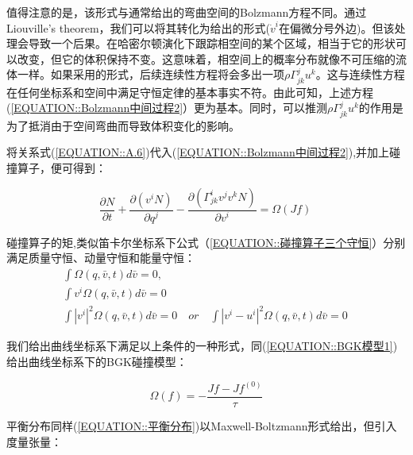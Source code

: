 \documentclass[LBMDerivation.tex]{subfiles}
\begin{document}
%

值得注意的是，该形式与通常给出的弯曲空间的Bolzmann方程不同。通过Liouville’s theorem，我们可以将其转化为\cite{mendoza2013flow}给出的形式($\dot{v}^i$在偏微分号外边)。但该处理会导致一个后果。在哈密尔顿演化下跟踪相空间的某个区域，相当于它的形状可以改变，但它的体积保持不变。这意味着，相空间上的概率分布就像不可压缩的流体一样。如果采用\cite{mendoza2013flow}的形式，后续连续性方程将会多出一项$\rho  \Gamma_{jk}^j u^k$。这与连续性方程在任何坐标系和空间中满足守恒定律的基本事实不符。由此可知，上述方程(\ref{EQUATION::Bolzmann中间过程2}）更为基本。同时，可以推测$\rho  \Gamma_{jk}^j u^k$的作用是为了抵消由于空间弯曲而导致体积变化的影响。
%

%

将关系式(\ref{EQUATION::A.6})代入(\ref{EQUATION::Bolzmann中间过程2}),并加上碰撞算子，便可得到：

\begin{equation}
  \boxed{
    \frac{\partial N}{\partial t}+\frac{\partial (v^i N)}{\partial q^{j}} -  \frac{\partial ( \Gamma_{j k}^{i} v^{j} v^{k}  N)}{\partial  v^i } =\Omega(Jf)
  }
  \label{EQUATION::Bolzamman 曲线} ~
\end{equation}










%
%

碰撞算子的矩,类似笛卡尔坐标系下公式（\ref{EQUATION::碰撞算子三个守恒}）分别满足质量守恒、动量守恒和能量守恒：
\begin{equation}
  \begin{aligned}
    \int  \Omega(q, \bar{v}, t)d \bar{v}=0,      \\
    \int  v^{i} \Omega(q, \bar{v}, t)d \bar{v}=0 \\
    \int|v^i|^2 \Omega(q, \bar{v}, t) d \bar{v} =0 \quad or \quad \int |v^i-u^i|^2 \Omega(q, \bar{v}, t) d \bar{v} =0
  \end{aligned}
  \label{EQUATION::碰撞特性} ~
\end{equation}
%

我们给出曲线坐标系下满足以上条件的一种形式，同(\ref{EQUATION::BGK模型1})给出曲线坐标系下的BGK碰撞模型：

\begin{equation}
  \boxed{
  \Omega(f)= -\frac{Jf-Jf^{(0)}}{\tau}
  }
\end{equation}


平衡分布同样(\ref{EQUATION::平衡分布})以Maxwell-Boltzmann形式给出，但引入度量张量：
%
%
\end{document}
